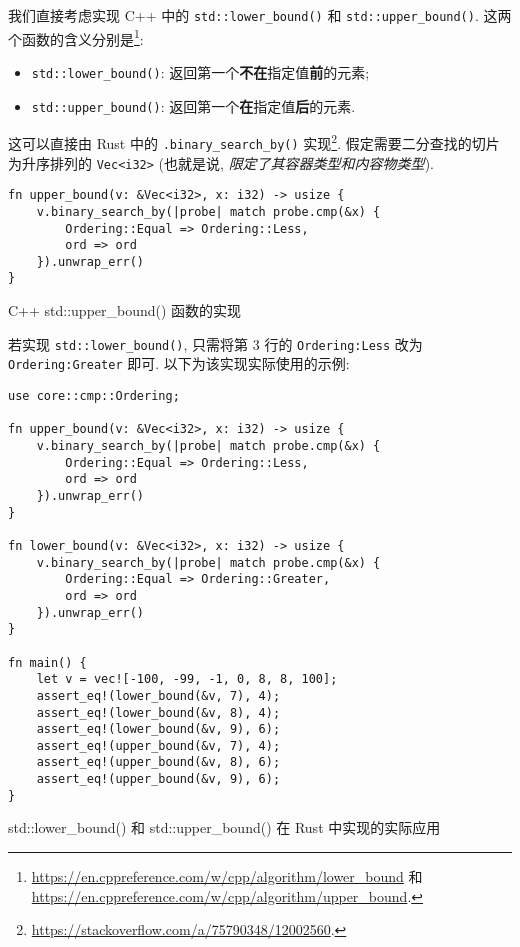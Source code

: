 \documentclass{crbook}
\begin{document}
我们直接考虑实现 C++ 中的 \texttt{std::lower\_bound()} 和 \texttt{std::upper\_bound()}. 这两个函数的含义分别是\footnote{\url{https://en.cppreference.com/w/cpp/algorithm/lower\_bound} 和 \url{https://en.cppreference.com/w/cpp/algorithm/upper\_bound}.}:

\begin{itemize}
    \item \texttt{std::lower\_bound()}: 返回第一个\textbf{不在}指定值\textbf{前}的元素;
    \item \texttt{std::upper\_bound()}: 返回第一个\textbf{在}指定值\textbf{后}的元素.
\end{itemize}

这可以直接由 Rust 中的 \texttt{.binary\_search\_by()} 实现\footnote{\url{https://stackoverflow.com/a/75790348/12002560}.}. 假定需要二分查找的切片为升序排列的 \texttt{Vec<i32>} (也就是说, \textit{限定了其容器类型和内容物类型}).

\begin{listing}
    \linespread{1}
    \begin{verbatim}
fn upper_bound(v: &Vec<i32>, x: i32) -> usize {
    v.binary_search_by(|probe| match probe.cmp(&x) {
        Ordering::Equal => Ordering::Less,
        ord => ord
    }).unwrap_err()
}
    \end{verbatim}
    \caption{C++ std::upper\_bound() 函数的实现}
\end{listing}

若实现 \texttt{std::lower\_bound()}, 只需将第 3 行的 \texttt{Ordering:Less} 改为 \texttt{Ordering:Greater} 即可. 以下为该实现实际使用的示例:

\begin{listing}
    \linespread{1}
    \begin{verbatim}
use core::cmp::Ordering;

fn upper_bound(v: &Vec<i32>, x: i32) -> usize {
    v.binary_search_by(|probe| match probe.cmp(&x) {
        Ordering::Equal => Ordering::Less,
        ord => ord
    }).unwrap_err()
}

fn lower_bound(v: &Vec<i32>, x: i32) -> usize {
    v.binary_search_by(|probe| match probe.cmp(&x) {
        Ordering::Equal => Ordering::Greater,
        ord => ord
    }).unwrap_err()
}

fn main() {
    let v = vec![-100, -99, -1, 0, 8, 8, 100];
    assert_eq!(lower_bound(&v, 7), 4);
    assert_eq!(lower_bound(&v, 8), 4);
    assert_eq!(lower_bound(&v, 9), 6);
    assert_eq!(upper_bound(&v, 7), 4);
    assert_eq!(upper_bound(&v, 8), 6);
    assert_eq!(upper_bound(&v, 9), 6);
}
    \end{verbatim}
    \caption{std::lower\_bound() 和 std::upper\_bound() 在 Rust 中实现的实际应用}
\end{listing}
\end{document}
